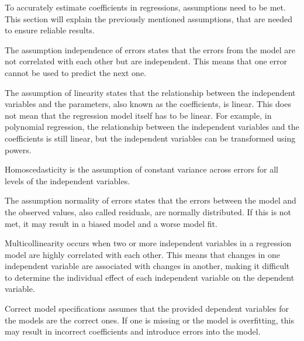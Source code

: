 To accurately estimate coefficients in regressions, assumptions need to be met. This section will explain the previously mentioned assumptions, that are needed to ensure reliable results.
\newline 

The assumption independence of errors states that the errors from the model are not correlated with each other but are independent. This means that one error cannot be used to predict the next one. \newline


 The assumption of linearity states that the relationship between the independent variables and the parameters, also known as the coefficients, is linear. This does not mean that the regression model itself has to be linear. For example, in polynomial regression, the relationship between the independent variables and the coefficients is still linear, but the independent variables can be transformed using powers.\newline


Homoscedasticity is the assumption of constant variance across errors for all levels of the independent variables. \newline

The assumption normality of errors states that the errors between the model and the observed values, also called residuals, are normally distributed. If this is not met, it may result in a biased model and a worse model fit. \newline


Multicollinearity occurs when two or more independent variables in a regression model are highly correlated with each other. This means that changes in one independent variable are associated with changes in another, making it difficult to determine the individual effect of each independent variable on the dependent variable. \newline

Correct model specifications assumes that the provided dependent variables for the models are the correct ones. If one is missing or the model is overfitting, this may result in incorrect coefficients and introduce errors into the model.

